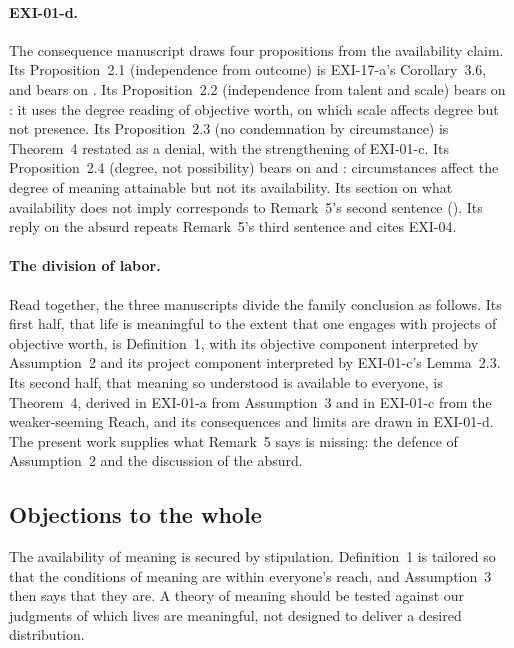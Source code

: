 \paragraph{EXI-01-d.} The consequence manuscript draws four propositions from the availability claim. Its Proposition~2.1 (independence from outcome) is EXI-17-a's Corollary~3.6, and bears on . Its Proposition~2.2 (independence from talent and scale) bears on : it uses the degree reading of objective worth, on which scale affects degree but not presence. Its Proposition~2.3 (no condemnation by circumstance) is Theorem~4 restated as a denial, with the strengthening of EXI-01-c. Its Proposition~2.4 (degree, not possibility) bears on  and : circumstances affect the degree of meaning attainable but not its availability. Its section on what availability does not imply corresponds to Remark~5's second sentence (). Its reply on the absurd repeats Remark~5's third sentence and cites EXI-04.

\paragraph{The division of labor.} Read together, the three manuscripts divide the family conclusion as follows. Its first half, that life is meaningful to the extent that one engages with projects of objective worth, is Definition~1, with its objective component interpreted by Assumption~2 and its project component interpreted by EXI-01-c's Lemma~2.3. Its second half, that meaning so understood is available to everyone, is Theorem~4, derived in EXI-01-a from Assumption~3 and in EXI-01-c from the weaker-seeming Reach, and its consequences and limits are drawn in EXI-01-d. The present work supplies what Remark~5 says is missing: the defence of Assumption~2 and the discussion of the absurd.

\subsection{Objections to the whole}

\begin{objection}[Circularity]\label{o:circ}
The availability of meaning is secured by stipulation. Definition~1 is tailored so that the conditions of meaning are within everyone's reach, and Assumption~3 then says that they are. A theory of meaning should be tested against our judgments of which lives are meaningful, not designed to deliver a desired distribution.
\end{objection}

